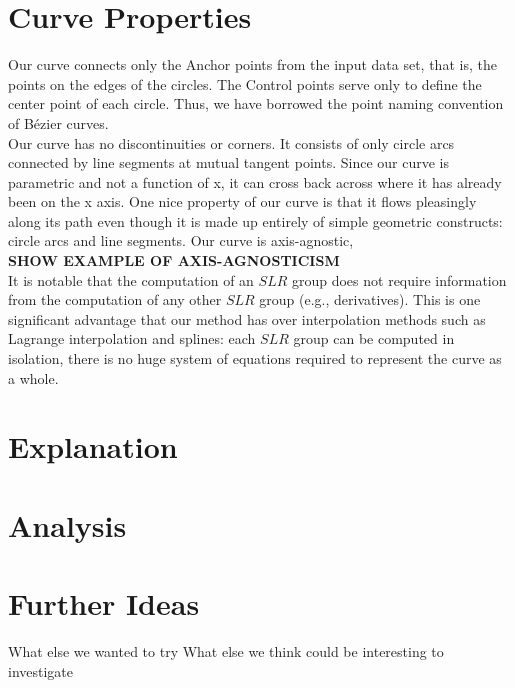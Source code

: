\documentclass{article}
\begin{document}
\section{Curve Properties}
Our curve connects only the Anchor points from the input data set, that is, the points on the edges of the circles. The Control points serve only to define the center point of each circle. Thus, we have borrowed the point naming convention  of B\'ezier curves.\\
Our curve has no discontinuities or corners. It consists of only circle arcs connected by line segments at mutual tangent points. Since our curve is parametric and not a function of x, it can cross back across where it has already been on the x axis. One nice property of our curve is that it flows pleasingly along its path even though it is made up entirely of simple geometric constructs: circle arcs and line segments.
Our curve is axis-agnostic,\\
\textbf{SHOW EXAMPLE OF AXIS-AGNOSTICISM}\\
It is notable that the computation of an $SLR$ group does not require information from the computation of any other $SLR$ group (e.g., derivatives). This is one significant advantage that our method has over interpolation methods such as Lagrange interpolation and splines: each $SLR$ group can be computed in isolation, there is no huge system of equations required to represent the curve as a whole.

\section{Explanation}



\section{Analysis}



\section{Further Ideas}
What else we wanted to try
What else we think could be interesting to investigate
\end{document}
